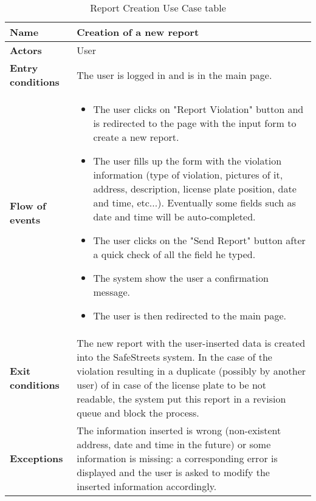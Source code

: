 \begin{table}[!htbp]
	\centering
	\begin{tabular}{lp{9cm}}
\bf\large Name&\bf\large Creation of a new report\\
\hline
\hline
\bf Actors&User\\
\hline
\bf Entry conditions&The user is logged in and is in the main page.\\
\hline
\bf Flow of events&
\begin{itemize}

\item The user clicks on "Report Violation" button and is redirected to the page with the input form to create a new report.

\item The user fills up the form with the violation information (type of violation, pictures of it, address, description, license plate position, date and time, etc...). Eventually some fields such as date and time will be auto-completed.

\item The user clicks on the "Send Report" button after a quick check of all the field he typed.

\item The system show the user a confirmation message. 

\item The user is then redirected to the main page.

\end{itemize}
\\
\hline
\bf Exit conditions&The new report with the user-inserted data is created into the SafeStreets system. In the case of the violation resulting in a duplicate (possibly by another user) of in case of the license plate to be not readable, the system put this report in a revision queue and block the process.\\
\hline
\bf Exceptions&The information inserted is wrong (non-existent address, date and time in the future) or some information is missing: a corresponding error is displayed and the user is asked to modify the inserted information accordingly.
\\
\hline

\end{tabular}
\caption{Report Creation Use Case table}
 \label{tab:reportcreationtab}
\end{table}
